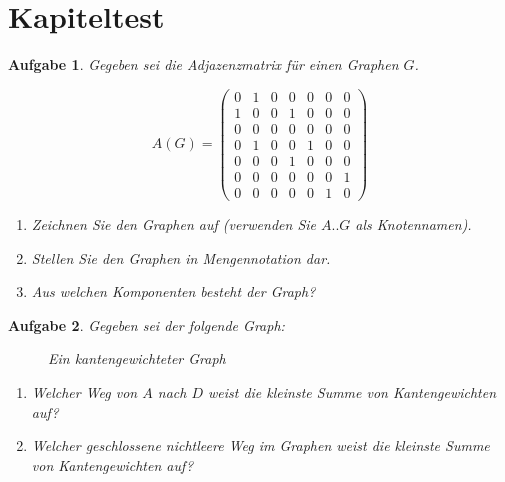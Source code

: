 \documentclass[12pt,a4paper]{report}
\theoremstyle{break}
\newtheorem{exercise}{Aufgabe}[chapter]
\theoremstyle{plain}
\begin{document}
\section{Kapiteltest}\label{graphchaptest}

\begin{exercise}\label{test1adjacency}
Gegeben sei die Adjazenzmatrix f\"{u}r einen Graphen $G$.

\begin{displaymath}
A(G) = \left(
\begin{array}{ccccccc}
0 & 1 & 0 & 0 & 0 & 0 & 0 \\
1 & 0 & 0 & 1 & 0 & 0 & 0 \\
0 & 0 & 0 & 0 & 0 & 0 & 0 \\
0 & 1 & 0 & 0 & 1 & 0 & 0 \\
0 & 0 & 0 & 1 & 0 & 0 & 0 \\
0 & 0 & 0 & 0 & 0 & 0 & 1 \\
0 & 0 & 0 & 0 & 0 & 1 & 0 
\end{array}
\right)
\end{displaymath}

\begin{enumerate}
\item Zeichnen Sie den Graphen auf (verwenden Sie $A..G$ als
  Knotennamen).
\item Stellen Sie den Graphen in Mengennotation dar.
\item Aus welchen Komponenten besteht der Graph?
\end{enumerate}

\end{exercise}

\begin{exercise}\label{test1weights}
Gegeben sei der folgende Graph:\\[-1cm]

\begin{figure}[h!]
\centerline{}
\caption{Ein kantengewichteter Graph}
\end{figure}

\begin{enumerate}
\item Welcher Weg von $A$ nach $D$ weist die kleinste Summe von
  Kantengewichten auf?
\item Welcher geschlossene nichtleere Weg im Graphen weist die kleinste Summe von
  Kantengewichten auf?
\end{enumerate}

\end{exercise}
\end{document}
